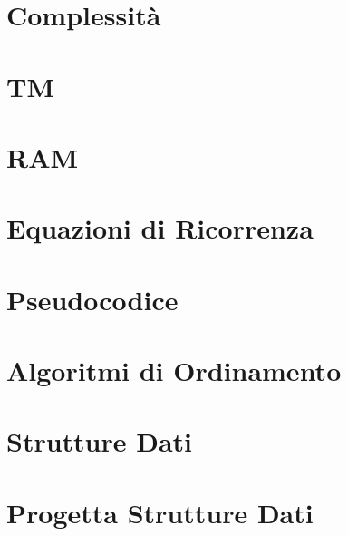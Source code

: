 



\begin{titlepage}
    \maketitle
    \thispagestyle{empty}  %
\end{titlepage}

\section{Complessità}

\newpage

\section{TM}

\newpage

\section{RAM}

\newpage

\section{Equazioni di Ricorrenza}

\newpage

\section{Pseudocodice}

\newpage

\section{Algoritmi di Ordinamento}

\newpage

\section{Strutture Dati}

\newpage

\section{Progetta Strutture Dati}


